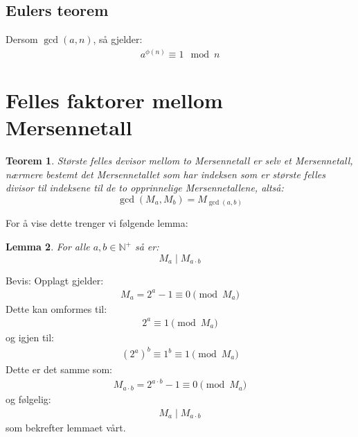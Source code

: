 \documentclass[a4paper,twoside]{article}
\theoremstyle{plain}
\newtheorem{thm}{Teorem}[section]
\newtheorem{lemma}[thm]{Lemma}
\newcommand{\setNp}{\mathbb{N}^+}
\begin{document}
\subsection{Eulers teorem}
Dersom $\gcd(a,n)$, så gjelder:
\begin{align}
	a^{\phi(n)} \equiv 1 \mod n
\end{align}

\section{Felles faktorer mellom Mersennetall}
\begin{thm}
	Største felles devisor mellom to Mersennetall er selv et Mersennetall, nærmere bestemt det Mersennetallet som har indeksen som er største felles divisor til indeksene til de to opprinnelige  Mersennetallene, altså:\[\gcd\left(M_a,M_b\right)=M_{\gcd(a,b)} \]
\end{thm}
For å vise dette trenger vi følgende lemma:
\begin{lemma}
	For alle $a,b \in \setNp$ så er:
\[ M_a\mid M_{a\cdot b} \]
\end{lemma}
Bevis:
Opplagt gjelder:
\begin{align}
M_a = 2^a-1\equiv 0 \pmod{M_a}
\end{align}
Dette kan omformes til:
\begin{align}
2^a \equiv 1  \pmod{M_a}
\end{align}
og igjen til:
\begin{align}
\left(2^a\right)^b\equiv 1^b\equiv 1 \pmod{M_a}
\end{align}
Dette er det samme som:
\begin{align}
M_{a\cdot b}=2^{a\cdot b}-1\equiv 0 \pmod{M_a}
\end{align}
og følgelig:
 \begin{align}
 M_a\mid M_{a\cdot b}
 \end{align}
som bekrefter lemmaet vårt. \bigskip
\end{document}
